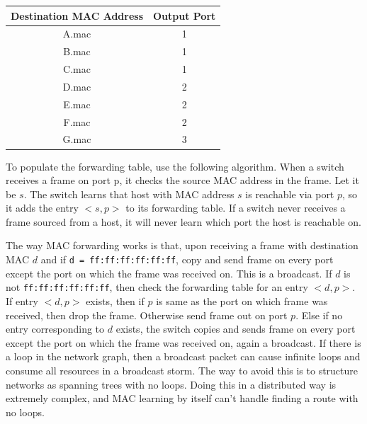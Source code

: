 \begin{table}[h]
    \centering
    \begin{tabular}{|c|c|}
        \hline
        \textbf{Destination MAC Address} & \textbf{Output Port} \\ \hline
        A.mac                            & 1                    \\ \hline
        B.mac                            & 1                    \\ \hline
        C.mac                            & 1                    \\ \hline
        D.mac                            & 2                    \\ \hline
        E.mac                            & 2                    \\ \hline
        F.mac                            & 2                    \\ \hline
        G.mac                            & 3                    \\ \hline
    \end{tabular}
\end{table}

To populate the forwarding table, use the following algorithm.
When a switch receives a frame on port p, it checks the source
MAC address in the frame. Let it be $s$.
The switch learns that host with MAC address $s$ is reachable via port $p$,
so it adds the entry $<s, p>$ to its forwarding table.
If a switch never receives a frame sourced from a host, it
will never learn which port the host is reachable on.

The way MAC forwarding works is that, upon receiving a frame with destination
MAC $d$ and if \texttt{d = ff:ff:ff:ff:ff:ff}, copy and send frame on every
port except the port on which the frame was received on. This is a broadcast.
If $d$ is not \texttt{ff:ff:ff:ff:ff:ff}, then check the forwarding table
for an entry $<d, p>$. If entry $<d, p>$ exists, then if $p$ is same as the
port on which frame was received, then drop the frame. Otherwise send frame
out on port $p$. Else if no entry corresponding to $d$ exists, the switch
copies and sends frame on every port except the port on
which the frame was received on, again a broadcast. If there is a loop
in the network graph, then a broadcast packet can cause infinite loops
and consume all resources in a broadcast storm. The way to avoid this
is to structure networks as spanning trees with no loops. Doing this
in a distributed way is extremely complex, and MAC learning by itself
can't handle finding a route with no loops.

